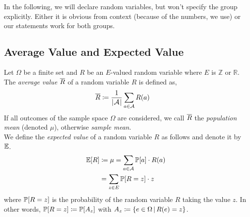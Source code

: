 In the following, we will declare random variables, but won't specify the group explicitly.
Either it is obvious from context (because of the numbers, we use) or
our statements work for both groups.

\subsection{Average Value and Expected Value}
\label{sec:bp-ae}
%
\begin{definition}
  Let $\Omega$ be a finite set and $R$ be an $E$-valued random variable where $E$ is $\mathbb Z$ or $\mathbb R$.
  The \emph{average value} $\overline{R}$ of a random variable $R$ is defined as,
  \begin{align}
    \overline{R} &\coloneqq \frac{1}{\left|\hskip .06667em \mathcal A\hskip .06667em \right|} \sum_{a \in \mathcal A} R(a)
  \end{align}
  If all outcomes of the sample space $\Omega$ are considered, we call $\overline{R}$ the \emph{population mean} (denoted $\mu$),
  otherwise \emph{sample mean}. \\
  We define the \emph{expected value} of a random variable $R$ as follows and denote it by $\mathbb E$.
  \begin{align}
    \mathbb E[R] &\coloneqq \mu = \sum_{a \in \mathcal A} \mathbb P[a] \cdot R(a) \\
          &= \sum_{z \in E} \mathbb P[R = z] \cdot z  \notag
  \end{align}
  where $\mathbb P[R = z]$ is the probability of the random variable $R$ taking the value $z$.
  In other words, $\mathbb P[R = z] \coloneqq \mathbb P[A_z]$ with $A_z \coloneqq \left\{e \in \Omega\,|\,R(e) = z\right\}$.
\end{definition}


